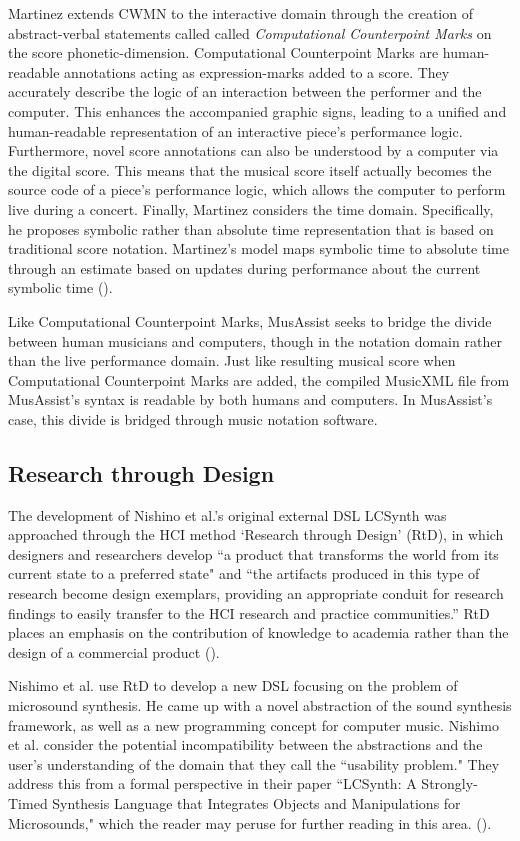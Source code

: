 \documentclass{report}
\newcommand\citeparen[1]{(\cite{#1})}
\begin{document}
Martinez extends CWMN to  the  interactive  domain through the creation of abstract-verbal statements called  called  \textit{Computational  Counterpoint Marks} on the score  phonetic-dimension. Computational  Counterpoint Marks are human-readable annotations acting  as expression-marks added  to a  score.  They accurately describe the logic of an interaction between the performer and the  computer. This  enhances the accompanied  graphic  signs,  leading  to a  unified and human-readable representation of an interactive  piece's  performance logic. Furthermore, novel score annotations can also be  understood by a computer via  the  digital  score. This means that the musical score itself actually becomes the source  code of a piece's  performance logic, which allows the  computer to perform live  during a concert. Finally, Martinez considers  the time domain. Specifically, he proposes symbolic rather  than absolute time representation that is  based on traditional score notation. Martinez's  model maps symbolic time  to  absolute time through an estimate based on updates during performance about the current  symbolic time \citeparen{martinez_2021}.

Like Computational Counterpoint Marks, MusAssist seeks to bridge the divide between human musicians and computers, though in the notation domain rather than the live performance domain. Just like resulting musical score when Computational Counterpoint Marks are added, the compiled MusicXML file from MusAssist's syntax is readable by both humans and computers. In MusAssist's case, this divide is bridged through music notation software.
 
\subsection{Research through Design}
The development of Nishino et al.'s original external DSL LCSynth was approached through the HCI method `Research through Design' (RtD),   in which designers and researchers develop ``a product that transforms the world from its current state to a preferred state" and ``the artifacts produced in this type of research become design exemplars, providing an appropriate conduit for research findings to easily transfer to the HCI research and practice communities.” RtD places an emphasis on the contribution of knowledge to academia  rather than the design of a commercial product \citeparen{nishino_2012}.

Nishimo et al. use RtD to develop a new DSL focusing on the problem of microsound  synthesis. He came up with a novel  abstraction of the sound synthesis framework, as well  as a new programming concept for computer music. Nishimo  et al. consider the potential incompatibility between the abstractions and the user's understanding of the domain that they call   the ``usability problem." They address this from  a formal perspective in their paper ``LCSynth: A Strongly-Timed Synthesis Language that Integrates Objects and Manipulations for Microsounds," which the reader may peruse for further  reading in this area. 
 \citeparen{nishino_2012}.
 
\end{document}
